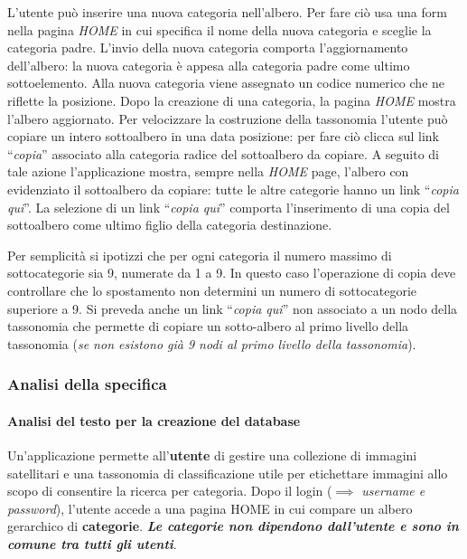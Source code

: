 L'utente può inserire una nuova categoria nell'albero. Per fare ciò usa
una form nella pagina \emph{HOME} in cui specifica il nome della nuova
categoria e sceglie la categoria padre. L'invio della nuova categoria
comporta l'aggiornamento dell'albero: la nuova categoria è appesa alla
categoria padre come ultimo sottoelemento. Alla nuova categoria viene
assegnato un codice numerico che ne riflette la posizione. Dopo la
creazione di una categoria, la pagina \emph{HOME} mostra l'albero
aggiornato. Per velocizzare la costruzione della tassonomia l'utente può
copiare un intero sottoalbero in una data posizione: per fare ciò clicca
sul link ``\emph{copia}'' associato alla categoria radice del
sottoalbero da copiare. A seguito di tale azione l'applicazione mostra,
sempre nella \emph{HOME} page, l'albero con evidenziato il sottoalbero
da copiare: tutte le altre categorie hanno un link ``\emph{copia qui}''.
La selezione di un link ``\emph{copia qui}'' comporta l'inserimento di
una copia del sottoalbero come ultimo figlio della categoria
destinazione.

Per semplicità si ipotizzi che per ogni categoria il numero massimo di
sottocategorie sia 9, numerate da 1 a 9. In questo caso l'operazione di
copia deve controllare che lo spostamento non determini un numero di
sottocategorie superiore a 9. Si preveda anche un link ``\emph{copia
qui}'' non associato a un nodo della tassonomia che permette di copiare
un sotto-albero al primo livello della tassonomia (\emph{se non esistono
già 9 nodi al primo livello della tassonomia}).

\pagebreak

\hypertarget{analisi-della-specifica}{%
\subsubsection{Analisi della specifica}\label{analisi-della-specifica}}

\hypertarget{analisi-del-testo-per-la-creazione-del-database}{%
\paragraph{Analisi del testo per la creazione del
database}\label{analisi-del-testo-per-la-creazione-del-database}}

Un'applicazione permette all'\textbf{utente} di gestire una collezione
di immagini satellitari e una tassonomia di classificazione utile per
etichettare immagini allo scopo di consentire la ricerca per categoria.
Dopo il login (\(\implies\) \emph{username e password}), l'utente accede
a una pagina HOME in cui compare un albero gerarchico di
\textbf{categorie}. \textbf{\emph{Le categorie non dipendono dall'utente
e sono in comune tra tutti gli utenti}}.

